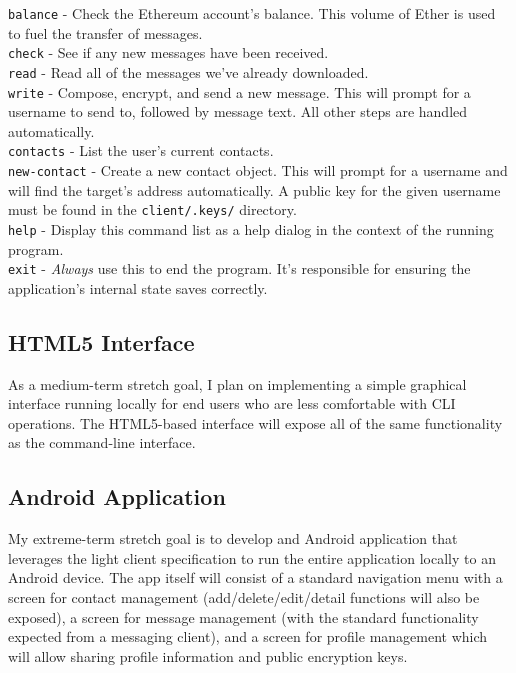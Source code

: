 \documentclass[titlepage]{report}
\begin{document}
{\raggedright{}
    \texttt{balance} - Check the Ethereum account's balance. This volume of Ether is used to fuel the transfer of messages.\\
    \texttt{check} - See if any new messages have been received.\\
    \texttt{read} - Read all of the messages we've already downloaded.\\
    \texttt{write} - Compose, encrypt, and send a new message. This will prompt for a username to send to, followed by message text. All other steps are handled automatically.\\
    \texttt{contacts} - List the user's current contacts.\\
    \texttt{new-contact} - Create a new contact object. This will prompt for a username and will find the target's address automatically. A public key for the given username must be found in the \texttt{client/.keys/} directory.\\
    \texttt{help} - Display this command list as a help dialog in the context of the running program.\\
    \texttt{exit} - \textit{Always} use this to end the program. It's responsible for ensuring the application's internal state saves correctly.\\
}

\subsection{HTML5 Interface}
As a medium-term stretch goal, I plan on implementing a simple graphical interface running locally for end users who are less comfortable with CLI operations. The HTML5-based interface will expose all of the same functionality as the command-line interface.

\subsection{Android Application}
My extreme-term stretch goal is to develop and Android application that leverages the light client specification to run the entire application locally to an Android device. The app itself will consist of a standard navigation menu with a screen for contact management (add/delete/edit/detail functions will also be exposed), a screen for message management (with the standard functionality expected from a messaging client), and a screen for profile management which will allow sharing profile information and public encryption keys.
\end{document}
